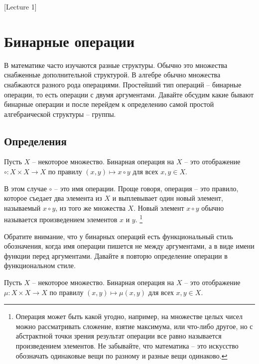 [Lecture 1]


\newpage

\section{Бинарные операции}

В математике часто изучаются разные структуры.
Обычно это множества снабженные дополнительной структурой.
В алгебре обычно множества снабжаются разного рода операциями.
Простейший тип операций -- бинарные операции, то есть операции с двумя аргументами.
Давайте обсудим какие бывают бинарные операции и после перейдем к определению самой простой алгебраической структуры -- группы.

\subsection{Определения}

\begin{definition}
Пусть $X$ -- некоторое множество.
Бинарная операция на $X$ -- это отображение $\circ\colon X\times X\to X$ по правилу $(x, y)\mapsto x\circ y$ для всех $x, y\in X$.
\end{definition}

В этом случае $\circ$ -- это имя операции.
Проще говоря, операция -- это правило, которое съедает два элемента из $X$ и выплевывает один новый элемент, называемый $x\circ y$, из того же множества $X$.
Новый элемент $x\circ y$ обычно называется произведением элементов $x$ и $y$.%
\footnote{Операция может быть какой угодно, например, на множестве целых чисел можно рассматривать сложение, взятие максимума, или что-либо другое, но с абстрактной точки зрения результат операции все равно называется произведением элементов.
Не забывайте, что математика -- это искусство обозначать одинаковые вещи по разному и разные вещи одинаково.}

Обратите внимание, что у бинарных операций есть функциональный стиль обозначения, когда имя операции пишется не между аргументами, а в виде имени функции перед аргументами.
Давайте я повторю определение операции в функциональном стиле.

\begin{definition}
Пусть $X$ -- некоторое множество.
Бинарная операция на $X$ -- это отображение $\mu\colon X\times X\to X$ по правилу $(x, y)\mapsto \mu(x, y)$ для всех $x, y\in X$.
\end{definition}


